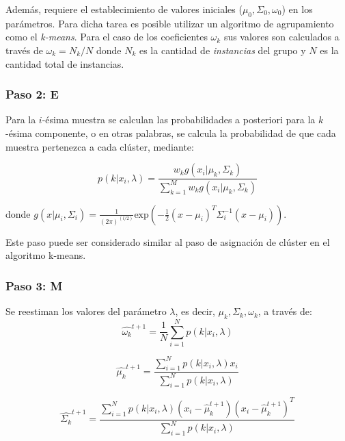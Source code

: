 \documentclass[a4paper]{article}
\begin{document}
Además, requiere el establecimiento de valores iniciales ($\mu_0, \Sigma_0, \omega_0$) en los parámetros. 
Para dicha tarea es posible utilizar un algoritmo de agrupamiento como el \emph{k-means}.
Para el caso de los coeficientes $\omega _k$ sus valores son calculados a través de $\omega _k = N_k / N$ donde $N_k$ es la cantidad de \emph{instancias} del grupo y $N$ es la cantidad total de instancias.


\subsubsection{Paso 2: E} %
\label{ssub:paso_e}
Para la $i$-ésima muestra se calculan las probabilidades a posteriori para la $k$-ésima componente, o en otras palabras, se calcula la probabilidad de que cada muestra pertenezca a cada clúster, mediante:

\begin{equation}
p(k|x_i,\lambda) = \frac{w_k g(x_i | \mu_k,\Sigma_k)}{\sum_{k=1}^{M} w_k g(x_i|\mu_k,\Sigma_k)}
\end{equation}

donde $g(x|\mu _i,\Sigma_i)  = \frac{1}{(2 \pi)^{(l/2)}}\text{exp} \left(  -\frac{1}{2}(x-\mu _i)^T \Sigma _i^{-1} (x-\mu _i) \right)$.

Este paso puede ser considerado similar al paso de asignación de clúster en el algoritmo k-means.


\subsubsection{Paso 3: M} %
\label{ssub:paso_m}
Se reestiman los valores del parámetro $\lambda$, es decir, $\mu_k, \Sigma_k, \omega_k$, a través de:
\begin{equation}
	\hat{\omega _k}^{t+1} = \frac{1}{N} \sum_{i=1}^{N} p(k|x_i,\lambda)
\end{equation}

\begin{equation}
	\hat{\mu _k}^{t+1} = \frac{\sum_{i=1}^{N} p(k|x_i,\lambda) x_i}{\sum_{i=1}^{N} p(k|x_i,\lambda)}
\end{equation}

\begin{equation}
	\hat{\Sigma _k}^{t+1} = \frac{\sum_{i=1}^{N} p\left(  k|x_i,\lambda \right ) \left( x_i - \hat{\mu}_k^{t+1} \right ) \left( x_i - \hat{\mu}_k^{t+1} \right )^T}{\sum_{i=1}^{N} p\left(  k|x_i,\lambda \right )}
\end{equation}
\end{document}
